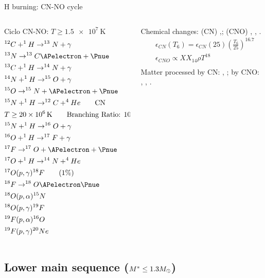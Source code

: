 \begin{frame}{H burning: CN-NO cycle}
\begin{columns}[T]\begin{column}{0.4\textwidth}
        Ciclo CN-NO: $T\geq\SI{1.5e7}{\kelvin}$
\begin{align*}
&^{12}C+^1H\to^{13}N+\gamma\\
&^{13}N\to^{13}C\APelectron+\Pnue\\
&^{13}C+^1H\to^{14}N+\gamma\\
&^{14}N+^1H\to^{15}O+\gamma\\
&^{15}O\to^{15}N+\APelectron+\Pnue\\
&^{15}N+^1H\to^{12}C+^4He\tag*{CN}\\
&T\geq\SI{20e6}{\kelvin}\tag*{Branching Ratio: \num{e-4}}\\
&^{15}N+^1H\to^{16}O+\gamma\\
&^{16}O+^1H\to^{17}F+\gamma\\
&^{17}F\to^{17}O+\APelectron+\Pnue\\
&^{17}O+^1H\to^{14}N+^4He\\
&^{17}O(p,\gamma)^{18}F\tag{$1\%$}\\
&^{18}F\to^{18}O\APelectron\Pnue\\
&^{18}O(p,\alpha)^{15}N\\
&^{18}O(p,\gamma)^{19}F\\
&^{19}F(p,\alpha)^{16}O\\
&^{19}F(p,\gamma)^{20}Ne
\end{align*} 
\end{column}\begin{column}{0.6\textwidth}
    Chemical changes: (CN) ,; (CNO) , , .
    \begin{align*}
&\epsilon_{CN}(T_6)=\epsilon_{CN}(25)(\frac{T_6}{25})^{16.7}\\
&\epsilon_{CNO}\propto XX_{14}\rho T^{18}\\
&
\end{align*}
Matter processed by CN: , ; by CNO: , , .
\end{column}\end{columns}
\end{frame} 

\subsection{Lower main sequence ($M^*\leq1.3M_{\odot}{}$)}

